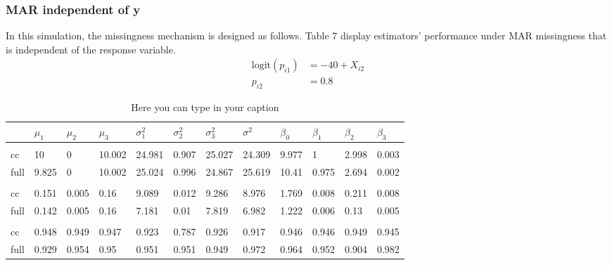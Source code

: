 \documentclass[
  twocolumn]{article}
\begin{document}
\hypertarget{mar-independent-of-y}{%
\subsubsection{MAR independent of y}\label{mar-independent-of-y}}

In this simulation, the missingness mechanism is designed as follows.
Table 7 display estimators' performance under MAR missingness that is
independent of the response variable. \[
\begin{aligned}
\mathrm{logit}(p_{i1}) &= -40 + X_{i2} \\
p_{i2} &= 0.8
\end{aligned}
\]

\begin{table*}[hbp]
\caption{Here you can type in your caption}
\begingroup\fontsize{7}{9}\selectfont

\begin{tabu} to 
\toprule
 & $\mu_1$ & $\mu_2$ & $\mu_3$ & $\sigma^2_1$ & $\sigma^2_2$ & $\sigma^2_3$ & $\sigma^2$ & $\beta_0$ & $\beta_1$ & $\beta_2$ & $\beta_3$\\
\midrule
\addlinespace[0.3em]
\\
\hspace{1em}cc & 10 & 0 & 10.002 & 24.981 & 0.907 & 25.027 & 24.309 & 9.977 & 1 & 2.998 & 0.003\\
\hspace{1em}full & 9.825 & 0 & 10.002 & 25.024 & 0.996 & 24.867 & 25.619 & 10.41 & 0.975 & 2.694 & 0.002\\
\addlinespace[0.3em]
\\
\hspace{1em}cc & 0.151 & 0.005 & 0.16 & 9.089 & 0.012 & 9.286 & 8.976 & 1.769 & 0.008 & 0.211 & 0.008\\
\hspace{1em}full & 0.142 & 0.005 & 0.16 & 7.181 & 0.01 & 7.819 & 6.982 & 1.222 & 0.006 & 0.13 & 0.005\\
\addlinespace[0.3em]
\\
\hspace{1em}cc & 0.948 & 0.949 & 0.947 & 0.923 & 0.787 & 0.926 & 0.917 & 0.946 & 0.946 & 0.949 & 0.945\\
\hspace{1em}full & 0.929 & 0.954 & 0.95 & 0.951 & 0.951 & 0.949 & 0.972 & 0.964 & 0.952 & 0.904 & 0.982\\
\bottomrule
\end{tabu}
\endgroup{}
\end{table*}
\end{document}
